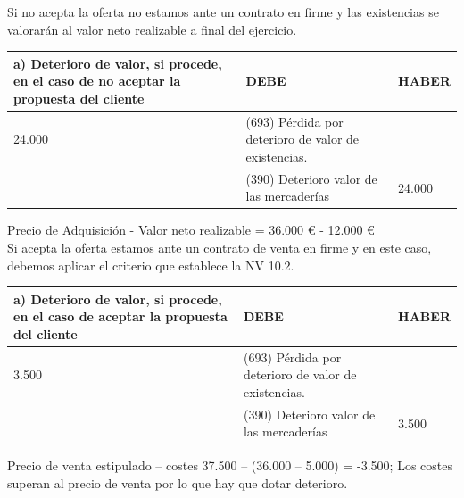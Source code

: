 \documentclass{article}
\begin{document}
Si no acepta la oferta no estamos ante un contrato en firme y las existencias se valorarán al valor neto realizable a final del ejercicio.

\begin{table}[h!]
\centering
\begin{tabular}{|p{4cm}|p{4cm}|p{4cm}|}
\hline
\textbf{a) Deterioro de valor, si procede, en el caso de no aceptar la propuesta del cliente} & \textbf{DEBE} & \textbf{HABER} \\
\hline
24.000 & (693) Pérdida por deterioro de valor de existencias. & \\
 & (390) Deterioro valor de las mercaderías & 24.000 \\
\hline
\end{tabular}
\end{table}

Precio de Adquisición - Valor neto realizable = 36.000 € - 12.000 €\\

Si acepta la oferta estamos ante un contrato de venta en firme y en este caso, debemos aplicar el criterio que establece la NV 10.2.

\begin{table}[h!]
\centering
\begin{tabular}{|p{4cm}|p{4cm}|p{4cm}|}
\hline
\textbf{a) Deterioro de valor, si procede, en el caso de aceptar la propuesta del cliente} & \textbf{DEBE} & \textbf{HABER} \\
\hline
3.500 & (693) Pérdida por deterioro de valor de existencias. & \\
 & (390) Deterioro valor de las mercaderías & 3.500 \\
\hline
\end{tabular}
\end{table}

Precio de venta estipulado – costes 37.500 – (36.000 – 5.000) = -3.500; Los costes superan al precio de venta por lo que hay que dotar deterioro.

\end{document}
